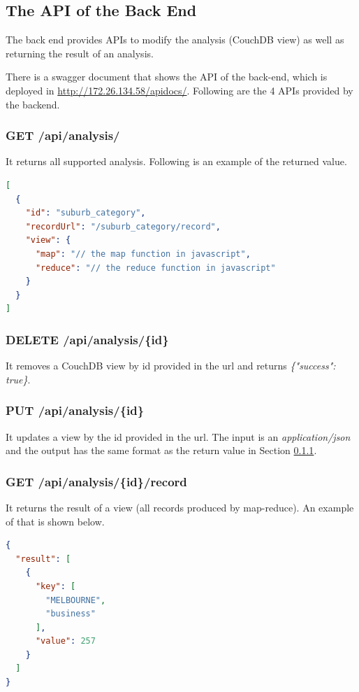 \documentclass[parskip=full, 11pt]{article}
\begin{document}
\subsection{The API of the Back End}

The back end provides APIs to modify the analysis (CouchDB view) as well as returning the result of an analysis.

There is a swagger document that shows the API of the back-end, which is deployed in \url{http://172.26.134.58/apidocs/}. Following are the 4 APIs provided by the backend.

\subsubsection{GET /api/analysis/} \label{sec:get_analysis}
It returns all supported analysis. Following is an example of the returned value.

\begin{lstlisting}[language=Json]
[
  {
    "id": "suburb_category",
    "recordUrl": "/suburb_category/record",
    "view": {
      "map": "// the map function in javascript",
      "reduce": "// the reduce function in javascript"
    }
  }
]
\end{lstlisting}

\subsubsection{DELETE /api/analysis/\{id\}}
It removes a CouchDB view by id provided in the url and returns \emph{\{"success": true\}}.

\subsubsection{PUT /api/analysis/\{id\}}
It updates a view by the id provided in the url. The input is an \emph{application/json} and the output has the same format as the return value in Section \ref{sec:get_analysis}.

\subsubsection{GET /api/analysis/\{id\}/record}
It returns the result of a view (all records produced by map-reduce). An example of that is shown below.

\begin{lstlisting}[language=Json]
{
  "result": [
    {
      "key": [
        "MELBOURNE",
        "business"
      ],
      "value": 257
    }
  ]
}
\end{lstlisting}
\end{document}
